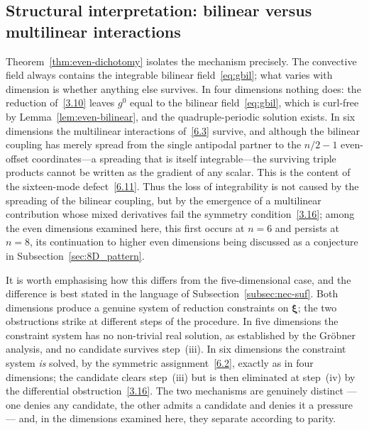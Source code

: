 \documentclass[11pt]{jfm}
\numberwithin{equation}{section}
\begin{document}
\subsection{Structural interpretation: bilinear versus multilinear interactions}
Theorem~\ref{thm:even-dichotomy} isolates the mechanism precisely. The convective field
always contains the integrable bilinear field~\eqref{eq:gbil}; what varies with dimension is
whether anything else survives. In four dimensions nothing does: the reduction of~\eqref{3.10}
leaves $g^0$ equal to the bilinear field~\eqref{eq:gbil}, which is curl-free by
Lemma~\ref{lem:even-bilinear}, and the quadruple-periodic solution exists. In
six dimensions the multilinear interactions of~\eqref{6.3} survive, and although the bilinear
coupling has merely spread from the single antipodal partner to the $n/2-1$ even-offset
coordinates---a spreading that is itself integrable---the surviving triple products cannot be
written as the gradient of any scalar. This is the content of the sixteen-mode
defect~\eqref{6.11}. Thus the loss of integrability is not caused by the spreading of the
bilinear coupling, but by the emergence of a multilinear contribution whose mixed derivatives
fail the symmetry condition~\eqref{3.16}; among the even dimensions examined here, this first occurs at $n=6$ and persists at $n=8$, its
continuation to higher even dimensions being discussed as a conjecture in
Subsection~\ref{sec:8D_pattern}.

It is worth emphasising how this differs from the five-dimensional case, and the difference is
best stated in the language of Subsection~\ref{subsec:nec-suf}. Both dimensions produce a genuine
system of reduction constraints on $\boldsymbol{\xi}$; the two obstructions strike at different
steps of the procedure. In five dimensions the constraint system has no non-trivial real solution, as established by the
Gr\"obner analysis, and no candidate survives step~(iii). In six dimensions the constraint system \emph{is} solved, by the
symmetric assignment~\eqref{6.2}, exactly as in four dimensions; the candidate clears step~(iii)
but is then eliminated at step~(iv) by the differential obstruction~\eqref{3.16}. The two
mechanisms are genuinely distinct --- one denies any candidate, the other admits a candidate and
denies it a pressure --- and, in the dimensions examined here, they separate according to parity.
\end{document}

